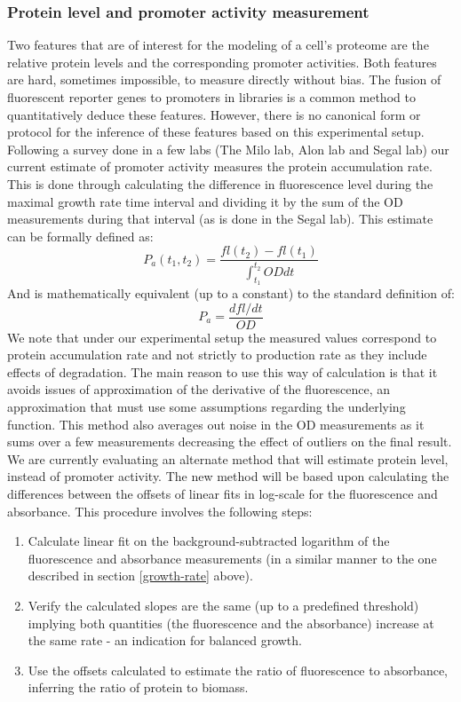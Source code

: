 \documentclass{report}
\begin{document}
\subsubsection{Protein level and promoter activity measurement}
Two features that are of interest for the modeling of a cell’s proteome are the relative protein levels and the corresponding promoter activities.
Both features are hard, sometimes impossible, to measure directly without bias.
The fusion of fluorescent reporter genes to promoters in libraries is a common method to quantitatively deduce these features.
However, there is no canonical form or protocol for the inference of these features based on this experimental setup.
Following a survey done in a few labs (The Milo lab, Alon lab and Segal lab) our current estimate of promoter activity measures the protein accumulation rate.
This is done through calculating the difference in fluorescence level during the maximal growth rate time interval and dividing it by the sum of the OD measurements during that interval (as is done in the Segal lab).
This estimate can be formally defined as:
\[
P_a(t_1,t_2)=\frac{fl(t_2)-fl(t_1)}{\int_{t_1}^{t_2}{OD dt}}
\]
And is mathematically equivalent (up to a constant) to the standard definition of:
\[
P_a=\frac{dfl/dt}{OD}
\]
We note that under our experimental setup the measured values correspond to protein accumulation rate and not strictly to production rate as they include effects of degradation.
The main reason to use this way of calculation is that it avoids issues of approximation of the derivative of the fluorescence, an approximation that must use some assumptions regarding the underlying function.
This method also averages out noise in the OD measurements as it sums over a few measurements decreasing the effect of outliers on the final result.
We are currently evaluating an alternate method that will estimate protein level, instead of promoter activity.
The new method will be based upon calculating the differences between the offsets of linear fits in log-scale for the fluorescence and absorbance.
This procedure involves the following steps:
\begin{enumerate}
\item Calculate linear fit on the background-subtracted logarithm of the fluorescence and absorbance measurements (in a similar manner to the one described in section \ref{growth-rate} above).
\item Verify the calculated slopes are the same (up to a predefined threshold) implying both quantities (the fluorescence and the absorbance) increase at the same rate - an indication for balanced growth.
\item Use the offsets calculated to estimate the ratio of fluorescence to absorbance, inferring the ratio of protein to biomass.
\end{enumerate}
\end{document}
